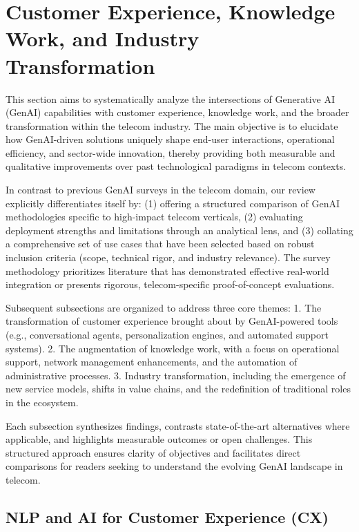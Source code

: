 \documentclass[sigconf]{acmart}
\begin{document}
\section{Customer Experience, Knowledge Work, and Industry Transformation}

This section aims to systematically analyze the intersections of Generative AI (GenAI) capabilities with customer experience, knowledge work, and the broader transformation within the telecom industry. The main objective is to elucidate how GenAI-driven solutions uniquely shape end-user interactions, operational efficiency, and sector-wide innovation, thereby providing both measurable and qualitative improvements over past technological paradigms in telecom contexts.

In contrast to previous GenAI surveys in the telecom domain, our review explicitly differentiates itself by: (1) offering a structured comparison of GenAI methodologies specific to high-impact telecom verticals, (2) evaluating deployment strengths and limitations through an analytical lens, and (3) collating a comprehensive set of use cases that have been selected based on robust inclusion criteria (scope, technical rigor, and industry relevance). The survey methodology prioritizes literature that has demonstrated effective real-world integration or presents rigorous, telecom-specific proof-of-concept evaluations.

Subsequent subsections are organized to address three core themes:
1. The transformation of customer experience brought about by GenAI-powered tools (e.g., conversational agents, personalization engines, and automated support systems).
2. The augmentation of knowledge work, with a focus on operational support, network management enhancements, and the automation of administrative processes.
3. Industry transformation, including the emergence of new service models, shifts in value chains, and the redefinition of traditional roles in the ecosystem.

Each subsection synthesizes findings, contrasts state-of-the-art alternatives where applicable, and highlights measurable outcomes or open challenges. This structured approach ensures clarity of objectives and facilitates direct comparisons for readers seeking to understand the evolving GenAI landscape in telecom.

\subsection{NLP and AI for Customer Experience (CX)}
\end{document}
